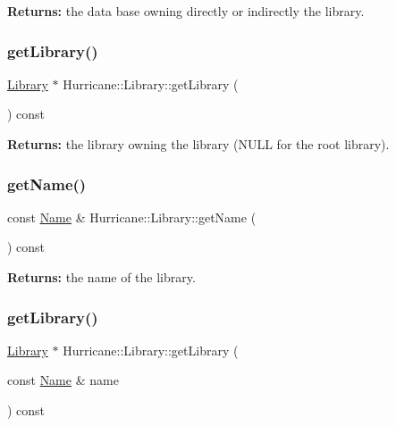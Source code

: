 {\bfseries Returns\+:} the data base owning directly or indirectly the library. \mbox{\label{classHurricane_1_1Library_a5299d19afc96c535d557b86ba42eaa82}} 
\subsubsection{\texorpdfstring{get\+Library()}{getLibrary()}\hspace{0.1cm}{\footnotesize\ttfamily [1/2]}}
{\footnotesize\ttfamily \hyperlink{classHurricane_1_1Library}{Library} $\ast$ Hurricane\+::\+Library\+::get\+Library (\begin{DoxyParamCaption}{ }\end{DoxyParamCaption}) const\hspace{0.3cm}{\ttfamily [inline]}}

{\bfseries Returns\+:} the library owning the library (N\+U\+LL for the root library). \mbox{\label{classHurricane_1_1Library_a13a9c4d0c43e2e1df09b7c0ee59f577f}} 
\subsubsection{\texorpdfstring{get\+Name()}{getName()}}
{\footnotesize\ttfamily const \hyperlink{classHurricane_1_1Name}{Name} \& Hurricane\+::\+Library\+::get\+Name (\begin{DoxyParamCaption}{ }\end{DoxyParamCaption}) const\hspace{0.3cm}{\ttfamily [inline]}}

{\bfseries Returns\+:} the name of the library. \mbox{\label{classHurricane_1_1Library_a8589e1ff3db5ef288c3027ceef28636b}} 
\subsubsection{\texorpdfstring{get\+Library()}{getLibrary()}\hspace{0.1cm}{\footnotesize\ttfamily [2/2]}}
{\footnotesize\ttfamily \hyperlink{classHurricane_1_1Library}{Library} $\ast$ Hurricane\+::\+Library\+::get\+Library (\begin{DoxyParamCaption}\item[{const \hyperlink{classHurricane_1_1Name}{Name} \&}]{name }\end{DoxyParamCaption}) const\hspace{0.3cm}{\ttfamily [inline]}}

